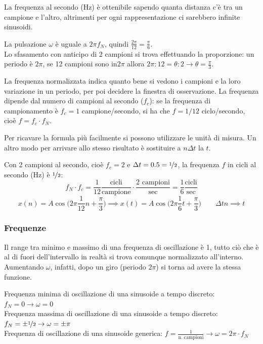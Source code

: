 La frequenza al secondo (Hz) è ottenibile sapendo quanta distanza c'è tra un campione e l'altro, altrimenti per ogni rappresentazione ci sarebbero infinite sinusoidi.

La pulsazione $\omega$ è uguale a $2\pi f_N$, quindi $\frac{2\pi}{12} = \frac{\pi}{6}$. \\
Lo sfasamento con anticipo di 2 campioni si trova effettuando la proporzione: un periodo è $2\pi$, se 12 campioni sono in$2\pi$ allora $2\pi : 12 = \theta : 2 \rightarrow \theta = \frac{\pi}{3}$.

La frequenza normalizzata indica quanto bene si vedono i campioni e la loro variazione in un periodo, per poi decidere la finestra di osservazione. La frequenza dipende dal numero di campioni al secondo ($f_c$): se la frequenza di campionamento è $f_c = 1$ campione/secondo, si ha che $f = 1/12$ ciclo/secondo, cioè $f = f_c \cdot f_N$.

Per ricavare la formula più facilmente si possono utilizzare le unità di misura. Un altro modo per arrivare allo stesso risultato è sostituire a $n\Delta t$ la $t$.

Con 2 campioni al secondo, cioè $f_c = 2$ e $\Delta t = 0.5 = \nicefrac{1}{2}$, la frequenza $f$ in cicli al secondo (Hz) è $\nicefrac{1}{2}$:
$$f_N \cdot f_c = \frac{1}{12} \frac{\text{cicli}}{\text{campione}} \cdot \frac{2 \text{ campioni}}{\text{sec}} = \frac{1}{6} \frac{\text{cicli}}{\text{sec}}$$
$$x(n) = A\cos \Big(2\pi \frac{1}{12}n + \frac{\pi}{3}\Big) \implies x(t) = A\cos\Big(2\pi \frac{1}{6}t + \frac{\pi}{3}\Big) \qquad \Delta tn \implies t$$

\subsubsection{Frequenze}
Il range tra minimo e massimo di una frequenza di oscillazione è 1, tutto ciò che è al di fuori dell'intervallo in realtà si trova comunque normalizzato all'interno. Aumentando $\omega$, infatti, dopo un giro (periodo $2\pi$) si torna ad avere la stessa funzione. 

Frequenza minima di oscillazione di una sinusoide a tempo discreto: $f_N = 0 \rightarrow \omega = 0$ \\
Frequenza massima di oscillazione di una sinusoide a tempo discreto: $f_N = \pm \nicefrac{1}{2} \rightarrow \omega = \pm \pi$ \\
Frequenza di oscillazione di una sinusoide generica: $f = \frac{1}{\text{n. campioni}} \rightarrow \omega = 2\pi \cdot f_N$

